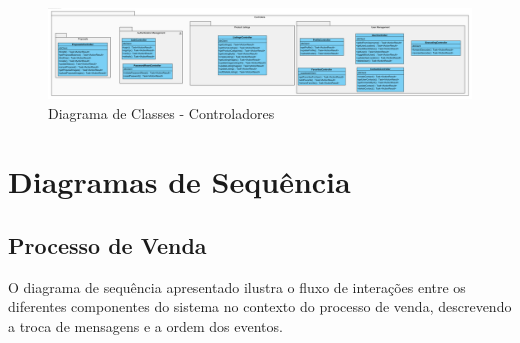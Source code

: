 \documentclass[a4paper, 12pt]{article} %
\begin{document}
\begin{figure}[ht]
	\centering
	\includegraphics[width=\textwidth]{../images/class-diagram-controllers.png}
	\caption{Diagrama de Classes - Controladores}
	\label{fig:class_diagram_controllers}
\end{figure}


\newpage
\section{Diagramas de Sequência}

\subsection{Processo de Venda}
O diagrama de sequência apresentado ilustra o fluxo de interações entre os diferentes componentes do sistema no contexto do processo de venda, descrevendo a troca de mensagens e a ordem dos eventos.
\end{document}
